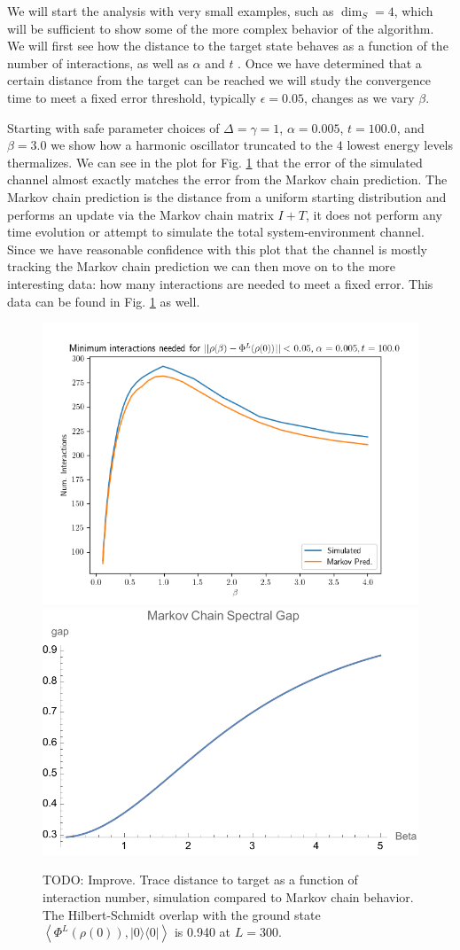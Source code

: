 \documentclass{article}
\newcommand{\ketbra}[2]{| #1\rangle\! \langle #2|}
\newcommand{\anglebrackets}[1]{\left< #1 \right>}
\begin{document}
We will start the analysis with very small examples, such as $\dim_S = 4$, which will be sufficient to show some of the more complex behavior of the algorithm. We will first see how the distance to the target state behaves as a function of the number of interactions, as well as $\alpha$ and $t$ . Once we have determined that a certain distance from the target can be reached we will study the convergence time to meet a fixed error threshold, typically $\epsilon = 0.05$, changes as we vary $\beta$. 

Starting with safe parameter choices of $\Delta = \gamma = 1$, $\alpha = 0.005$, $t = 100.0$, and $\beta = 3.0$ we show how a harmonic oscillator truncated to the $4$ lowest energy levels thermalizes. We can see in the plot for Fig. \ref{fig:enter-label} that the error of the simulated channel almost exactly matches the error from the Markov chain prediction. The Markov chain prediction is the distance from a uniform starting distribution and performs an update via the Markov chain matrix $I + T$, it does not perform any time evolution or attempt to simulate the total system-environment channel. Since we have reasonable confidence with this plot that the channel is mostly tracking the Markov chain prediction we can then move on to the more interesting data: how many interactions are needed to meet a fixed error. This data can be found in Fig. \ref{fig:enter-label} as well. 


\begin{figure}
    \centering
    \includegraphics[width=0.45\linewidth]{numerics/data/sho_l_vs_beta.png}
    \includegraphics[width=0.5\linewidth]{numerics/data/spec_gap_dim_4.pdf}
    \caption{TODO: Improve. Trace distance to target as a function of interaction number, simulation compared to Markov chain behavior. The Hilbert-Schmidt overlap with the ground state $\anglebrackets{\Phi^L(\rho(0)), \ketbra{0}{0}}$ is 0.940 at $L = 300$. }
    \label{fig:enter-label}
\end{figure}
\end{document}

